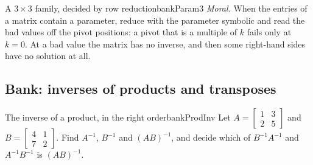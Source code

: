 \documentclass[11pt]{article}
\begin{document}
\begin{exmp}{A $3\times3$ family, decided by row reduction}{bankParam3}
\emph{Moral.} When the entries of a matrix contain a parameter, reduce with the parameter symbolic and read the bad values off the pivot positions: a pivot that is a multiple of $k$ fails only at $k=0$. At a bad value the matrix has no inverse, and then some right-hand sides have no solution at all.
\end{exmp}


\subsection*{Bank: inverses of products and transposes}

\begin{exmp}{The inverse of a product, in the right order}{bankProdInv}
Let $A=\begin{bmatrix}1&3\\2&5\end{bmatrix}$ and $B=\begin{bmatrix}4&1\\7&2\end{bmatrix}$. Find $A^{-1}$, $B^{-1}$ and $(AB)^{-1}$, and decide which of $B^{-1}A^{-1}$ and $A^{-1}B^{-1}$ is $(AB)^{-1}$.


\end{exmp}
\end{document}
